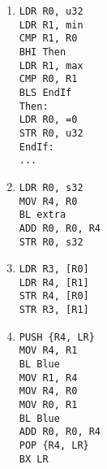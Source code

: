 \documentclass{article}
\begin{document}
\begin{enumerate}
\begin{multicols}{2}
\begin{enumerate}
{                EndIf:      \\
                ...         \\
                }
            \item
                \texttt{LDR R0, u32 \\
                LDR R1, min \\
                CMP R1, R0  \\
                BHI Then    \\
                LDR R1, max \\
                CMP R0, R1  \\
                BLS EndIf   \\
                Then:       \\
                LDR R0, =0  \\
                STR R0, u32 \\
                EndIf:      \\
                ...         \\
                }
            \item
                \texttt{LDR R0, s32 \\
                MOV R4, R0  \\
                BL extra    \\
                ADD R0, R0, R4  \\
                STR R0, s32 \\
                }
            \item
                \texttt{LDR R3, [R0]    \\
                LDR R4, [R1]    \\
                STR R4, [R0]    \\
                STR R3, [R1]    \\
                }
            \item
                \texttt{PUSH \{R4, LR\}  \\
                MOV R4, R1  \\
                BL Blue \\
                MOV R1, R4  \\
                MOV R4, R0  \\
                MOV R0, R1  \\
                BL Blue     \\
                ADD R0, R0, R4  \\
                POP \{R4, LR\}   \\
                BX LR       \\
                }
        \end{enumerate}
        \end{multicols}
\end{enumerate}
\end{document}
